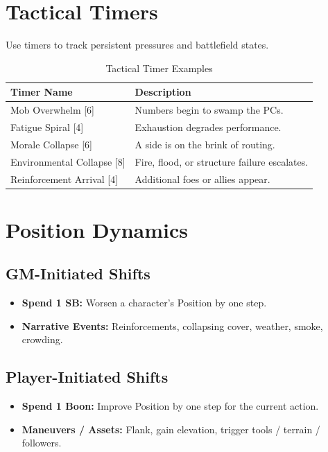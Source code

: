 \section{Tactical Timers}\label{sec:tactical_timers}
Use timers to track persistent pressures and battlefield states.

\begin{longtable}{p{4cm} p{9cm}}
\caption{Tactical Timer Examples}\label{tab:tactical_timers}\\
\toprule
\textbf{Timer Name} & \textbf{Description} \\
\midrule
Mob Overwhelm [6] & Numbers begin to swamp the PCs. \\
Fatigue Spiral [4] & Exhaustion degrades performance. \\
Morale Collapse [6] & A side is on the brink of routing. \\
Environmental Collapse [8] & Fire, flood, or structure failure escalates. \\
Reinforcement Arrival [4] & Additional foes or allies appear. \\
\bottomrule
\end{longtable}

\section{Position Dynamics}\label{sec:position_dynamics}

\subsection{GM-Initiated Shifts}\label{subsec:gm_shifts}
\begin{itemize}
    \item \textbf{Spend 1 SB:} Worsen a character's Position by one step.
    \item \textbf{Narrative Events:} Reinforcements, collapsing cover, weather, smoke, crowding.
\end{itemize}

\subsection{Player-Initiated Shifts}\label{subsec:player_shifts}
\begin{itemize}
    \item \textbf{Spend 1 Boon:} Improve Position by one step for the current action.
    \item \textbf{Maneuvers / Assets:} Flank, gain elevation, trigger tools / terrain / followers.
\end{itemize}

